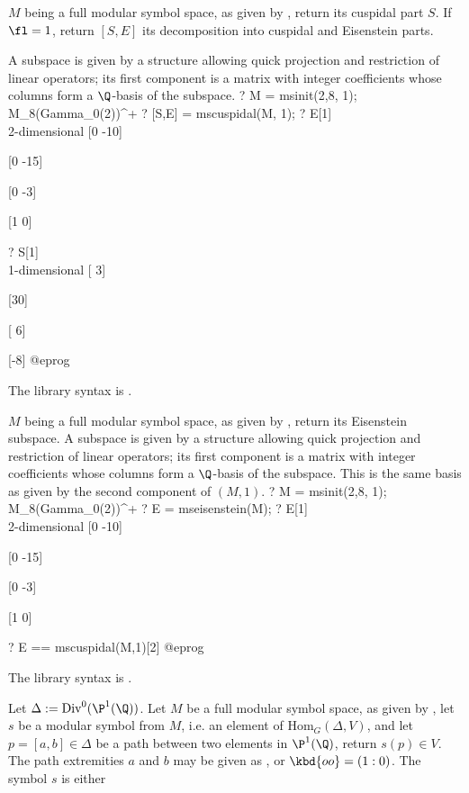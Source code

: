 \label{se:mscuspidal}
$M$ being a full modular symbol space, as given by ,
return its cuspidal part $S$. If $\fl = 1$, return
$[S,E]$ its decomposition into cuspidal and Eisenstein parts.

A subspace is given by a structure allowing quick projection and
restriction of linear operators; its first component is
a matrix with integer coefficients whose columns form a $\Q$-basis of
the subspace.
\bprog
? M = msinit(2,8, 1); \\ M_8(Gamma_0(2))^+
? [S,E] = mscuspidal(M, 1);
? E[1]  \\ 2-dimensional
[0 -10]

[0 -15]

[0  -3]

[1   0]

? S[1]  \\ 1-dimensional
[ 3]

[30]

[ 6]

[-8]
@eprog

The library syntax is .

\label{se:mseisenstein}
$M$ being a full modular symbol space, as given by ,
return its Eisenstein subspace.
A subspace is given by a structure allowing quick projection and
restriction of linear operators; its first component is
a matrix with integer coefficients whose columns form a $\Q$-basis of
the subspace.
This is the same basis as given by the second component of
$(M, 1)$.
\bprog
? M = msinit(2,8, 1); \\ M_8(Gamma_0(2))^+
? E = mseisenstein(M);
? E[1]  \\ 2-dimensional
[0 -10]

[0 -15]

[0  -3]

[1   0]

? E == mscuspidal(M,1)[2]
@eprog

The library syntax is .

\label{se:mseval}
Let $\Delta:=\text{Div}^0(\P^1 (\Q))$.
Let $M$ be a full modular symbol space, as given by ,
let $s$ be a modular symbol from $M$, i.e. an element
of $\text{Hom}_G(\Delta, V)$, and let $p=[a,b] \in \Delta$ be a path between
two elements in $\P^1(\Q)$, return $s(p)\in V$. The path extremities $a$ and
$b$ may be given as ,  or $\kbd{oo} = (1:0)$.
The symbol $s$ is either

